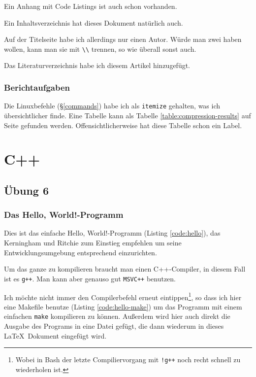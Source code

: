 \documentclass[12pt]{report}
\newcommand\gqq[1]{\glqq #1\grqq}
\begin{document}
Ein Anhang mit Code Listings ist auch schon vorhanden.

Ein Inhaltsverzeichnis hat dieses Dokument natürlich auch.

Auf der Titelseite habe ich allerdings nur einen Autor. Würde man zwei haben wollen, kann man sie mit \verb#\\# trennen, so wie überall sonst auch.

Das Literaturverzeichnis habe ich diesem Artikel hinzugefügt.

\section{Berichtaufgaben}

Die Linuxbefehle (§\ref{commands}) habe ich als \texttt{itemize} gehalten, was ich übersichtlicher finde. Eine Tabelle kann als Tabelle \ref{table:compression-results} auf Seite \pageref{table:compression-results} gefunden werden. Offensichtlicherweise hat diese Tabelle schon ein Label.


\part{C++}

\chapter{Übung 6}

\section{Das \gqq{Hello, World!}-Programm}

Dies ist das einfache \gqq{Hello, World!}-Programm (Listing \ref{code:hello}), das Kerningham und Ritchie zum Einstieg empfehlen um seine Entwicklungsumgebung entsprechend einzurichten.



Um das ganze zu kompilieren braucht man einen C++-Compiler, in diesem Fall ist es \texttt{g++}. Man kann aber genauso gut \texttt{MSVC++} benutzen.

Ich möchte nicht immer den Compilerbefehl erneut eintippen\footnote{Wobei in Bash der letzte Compiliervorgang mit \texttt{!g++} noch recht schnell zu wiederholen ist.}, so dass ich hier eine Makefile benutze (Listing \ref{code:hello-make}) um das Programm mit einem einfachen \texttt{make} kompilieren zu können. Außerdem wird hier auch direkt die Ausgabe des Programs in eine Datei gefügt, die dann wiederum in dieses \LaTeX\ Dokument eingefügt wird.
\end{document}
